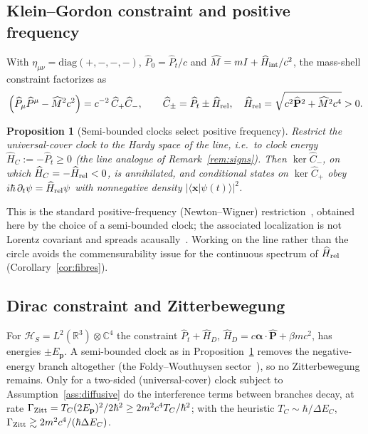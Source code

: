 \documentclass[aps,prd,onecolumn,notitlepage,10pt,amsmath,amssymb,amsfonts,nofootinbib]{revtex4-2}
\newtheorem{proposition}{Proposition}
\theoremstyle{definition}
\theoremstyle{remark}
\newcommand{\Hil}{\mathcal{H}}
\newcommand{\Cop}{\widehat{C}}
\newcommand{\Pt}{\widehat{P}_t}
\newcommand{\R}{\mathbb{R}}
\newcommand{\C}{\mathbb{C}}
\begin{document}
\subsection{Klein--Gordon constraint and positive frequency}
\label{sec:kg}
With $\eta_{\mu\nu}=\mathrm{diag}(+,-,-,-)$, $\widehat P_0=\Pt/c$ and $\widehat M=mI+\widehat H_{\rm int}/c^2$, the mass-shell constraint factorizes as
\begin{equation}
  \left(\widehat P_\mu\widehat P^\mu-\widehat M^2c^2\right)=c^{-2}\,\Cop_+\Cop_-,\qquad
  \Cop_\pm=\Pt\pm\widehat H_{\rm rel},\quad \widehat H_{\rm rel}=\sqrt{c^2\widehat{\mathbf P}^2+\widehat M^2c^4}>0 .
  \label{eq:kg}
\end{equation}
\begin{proposition}[Semi-bounded clocks select positive frequency]
\label{prop:kg}
Restrict the universal-cover clock to the Hardy space of the line, i.e.\ to clock energy $\widehat H_C:=-\Pt\ge0$ (the line analogue of Remark~\ref{rem:signs}). Then $\ker\Cop_-$, on which $\widehat H_C=-\widehat H_{\rm rel}<0$, is annihilated, and conditional states on $\ker\Cop_+$ obey $i\hbar\,\partial_t\psi=\widehat H_{\rm rel}\psi$ with nonnegative density $|\langle\mathbf x|\psi(t)\rangle|^2$.
\end{proposition}
This is the standard positive-frequency (Newton--Wigner) restriction~\cite{NewtonWigner1949}, obtained here by the choice of a semi-bounded clock; the associated localization is not Lorentz covariant and spreads acausally~\cite{Hegerfeldt1974}. Working on the line rather than the circle avoids the commensurability issue for the continuous spectrum of $\widehat H_{\rm rel}$ (Corollary~\ref{cor:fibres}).

\subsection{Dirac constraint and Zitterbewegung}
For $\Hil_S=L^2(\R^3)\otimes\C^4$ the constraint $\Pt+\widehat H_D$, $\widehat H_D=c\bm\alpha\cdot\widehat{\mathbf P}+\beta mc^2$, has energies $\pm E_{\mathbf p}$. A semi-bounded clock as in Proposition~\ref{prop:kg} removes the negative-energy branch altogether (the Foldy--Wouthuysen sector~\cite{FoldyWouthuysen1950}), so no Zitterbewegung remains. Only for a two-sided (universal-cover) clock subject to Assumption~\ref{ass:diffusive} do the interference terms between branches decay, at rate $\Gamma_{\rm Zitt}=T_C(2E_{\mathbf p})^2/2\hbar^2\ge 2m^2c^4T_C/\hbar^2$; with the heuristic $T_C\sim\hbar/\Delta E_C$, $\Gamma_{\rm Zitt}\gtrsim2m^2c^4/(\hbar\Delta E_C)$.
\end{document}
